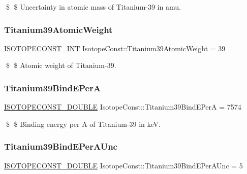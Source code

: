 \$ \$ Uncertainty in atomic mass of Titanium-\/39 in amu. \mbox{\label{group___isotope_const-_titanium-_ti39_ga86df3b34ee33880bb633b2445db2e642}} 
\subsubsection{\texorpdfstring{Titanium39\+Atomic\+Weight}{Titanium39AtomicWeight}}
{\footnotesize\ttfamily \mbox{\hyperlink{group___isotope_const-_macros_ga5f18360b3e99483a35c32d789e62621c}{I\+S\+O\+T\+O\+P\+E\+C\+O\+N\+S\+T\+\_\+\+I\+NT}} Isotope\+Const\+::\+Titanium39\+Atomic\+Weight = 39}

\$ \$ Atomic weight of Titanium-\/39. \mbox{\label{group___isotope_const-_titanium-_ti39_gaba9b223f5f7376f5c3cfe6b528e61d4a}} 
\subsubsection{\texorpdfstring{Titanium39\+Bind\+E\+PerA}{Titanium39BindEPerA}}
{\footnotesize\ttfamily \mbox{\hyperlink{group___isotope_const-_macros_ga8f45a7272ce02c0b4c65c44636ed719a}{I\+S\+O\+T\+O\+P\+E\+C\+O\+N\+S\+T\+\_\+\+D\+O\+U\+B\+LE}} Isotope\+Const\+::\+Titanium39\+Bind\+E\+PerA = 7574}

\$ \$ Binding energy per A of Titanium-\/39 in keV. \mbox{\label{group___isotope_const-_titanium-_ti39_gabf6beb70ec52abf7269084eeed1c766d}} 
\subsubsection{\texorpdfstring{Titanium39\+Bind\+E\+Per\+A\+Unc}{Titanium39BindEPerAUnc}}
{\footnotesize\ttfamily \mbox{\hyperlink{group___isotope_const-_macros_ga8f45a7272ce02c0b4c65c44636ed719a}{I\+S\+O\+T\+O\+P\+E\+C\+O\+N\+S\+T\+\_\+\+D\+O\+U\+B\+LE}} Isotope\+Const\+::\+Titanium39\+Bind\+E\+Per\+A\+Unc = 5}

